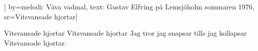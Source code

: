 [
	by={melodi: Väva vadmal, text: Gustav Elfving på Lemsjöholm sommaren 1976},					
	sr={Vitsvansade hjortar}]					
	
\beginverse*
Vitsvansade hjortar
Vitsvansade hjortar
Jag tror jag snapsar 
tills jag kollapsar
Vitsvansade hjortar.
\endverse									
\endsong							
